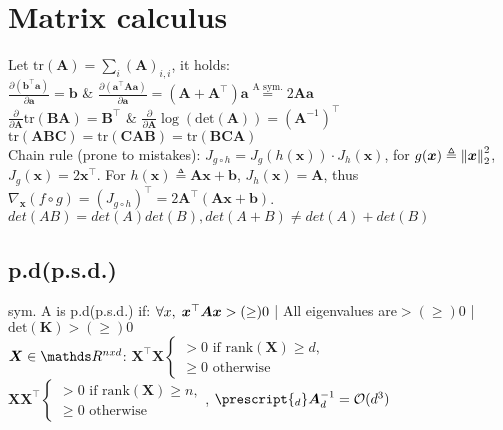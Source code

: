\section{Matrix calculus}
Let $\text{tr}(\bm{A})=\sum_{i}(\bm{A})_{i,i}$, it holds:\\
  $\frac{\partial(\bm{b}^{\top}\bm{a})}{\partial \bm{a}}=\bm{b}$ & $\frac{\partial(\bm{a}^{\top}\bm{Aa})}{\partial \bm{a}} = (\bm{A} + \bm{A}^{\top})\bm{a}
\overset{\text{A sym.}}{=} 2\bm{A}\bm{a}$\\
  $\frac{\partial}{\partial \bm{A}}\text{tr}(\bm{BA})=\bm{B}^{\top}$ & $\frac{\partial}{\partial \bm{A}}\log(\text{det}(\bm{A})) = (\bm{A}^{-1})^{\top}$
  $\text{tr}(\bm{ABC}) = \text{tr}(\bm{CAB}) = \text{tr}(\bm{BCA})$\\
Chain rule (prone to mistakes): $J_{g \circ h} = J_{g}(h(\bm{x})) \cdot J_{h}(\bm{x})$,
for $g(\bm{x}) \triangleq \left\lVert\bm{x}\right\rVert_{2}^{2}$, $J_{g}(\bm{x}) = 2\bm{x}^{\top}$.
For $h(\bm{x}) \triangleq \bm{A}\bm{x} + \bm{b}$, $J_{h}(\bm{x}) = \bm{A}$,
thus $\nabla_{\bm{x}} (f\circ g) = (J_{g \circ h})^{\top} = 2\bm{A}^{\top}(\bm{Ax}+\bm{b})$.\\
$det(AB) = det(A)det(B), det(A+B) \neq det(A) + det(B)$
\subsection{p.d(p.s.d.)}
sym. A is p.d(p.s.d.) if:
$\Forall {x} \bm{x}^{\top}\bm{A}\bm{x} >(\geq) 0$ | All eigenvalues are$>(\geq)0$ | $\text{det}(\bm{K}) >(\geq) 0$\\
$\bm{X}\in \R^{nxd}$: $\bm{X}^{\top}\bm{X} \begin{cases} > 0 \text{ if rank}(\bm{X}) \geq d, \\
\geq 0 \text{ otherwise}\end{cases}$
$\bm{X}\bm{X}^{\top} \begin{cases} > 0 \text{ if rank}(\bm{X}) \geq n, \\
\geq 0 \text{ otherwise}\end{cases}$, $\prescript{_{d}}\bm{A}_{d}^{-1}=\mathcal{O}(d^{3})$
